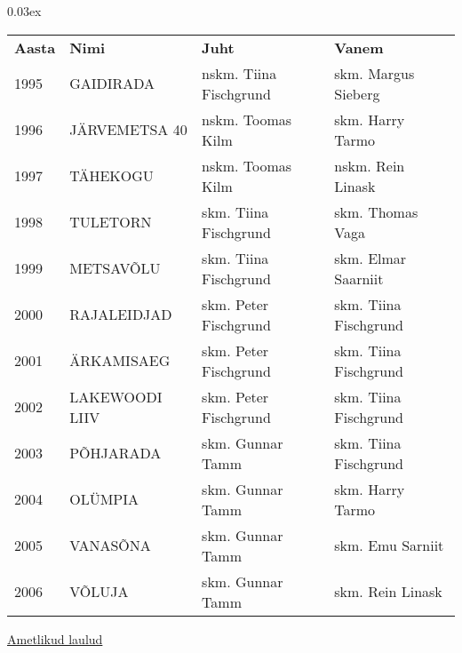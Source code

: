 \documentclass[12pt]{extbook}
\begin{document}
{\centering\scriptsize\arrayrulewidth 0.03ex
\begin{tabular*}{1.0\textwidth}{@{\extracolsep{\fill}}@{}l@{}@{}l@{}@{}l@{}@{}l@{}}
\bf{Aasta}	&	\bf{Nimi}				&	\bf{Juht}				&	\bf{Vanem}\\[2mm]
	1995	&	GAIDIRADA				&	nskm. Tiina Fischgrund	&	skm.  Margus Sieberg\\[2mm]
	1996	&	J\"ARVEMETSA 40			&	nskm. Toomas Kilm		&	skm. Harry Tarmo\\[2mm]
	1997	&	T\"AHEKOGU				&	nskm. Toomas Kilm		&	nskm. Rein Linask\\[2mm]
	1998	&	TULETORN				&	skm. Tiina Fischgrund	&	skm. Thomas Vaga\\[2mm]
	1999	&	METSAV\~OLU				&	skm. Tiina Fischgrund	&	skm. Elmar Saarniit\\[2mm]
	2000	&	RAJALEIDJAD				&	skm. Peter Fischgrund	&	skm. Tiina Fischgrund\\[2mm]
	2001	&	\"ARKAMISAEG			&	skm. Peter Fischgrund	&	skm. Tiina Fischgrund\\[2mm]
	2002	&	LAKEWOODI LIIV			&	skm. Peter Fischgrund	&	skm. Tiina Fischgrund\\[2mm]
	2003	&	P\~OHJARADA				&	skm. Gunnar Tamm		&	skm. Tiina Fischgrund\\[2mm]
	2004	&	OL\"UMPIA				&	skm. Gunnar Tamm		&	skm. Harry Tarmo\\[2mm]
	2005	&	VANAS\~ONA				&	skm. Gunnar Tamm		&	skm. Emu Sarniit\\[2mm]
	2006	&	V\~OLUJA				&	skm. Gunnar Tamm		&	skm. Rein Linask\\[2mm]
\end{tabular*}}\cleardoublepage
\null
{
  \samepage
  \raggedbottom
  \raggedright
  \sloppy
  \vspace{1.85in}
  \centerline{
    \underline{\large Ametlikud laulud}
  }
}
\cleardoublepage\clearpage
\end{document}
